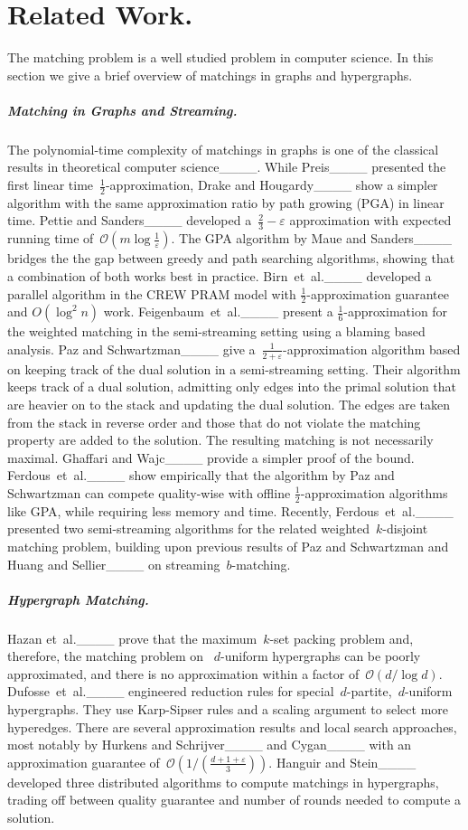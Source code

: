 \section{Related Work.}
The matching problem is a well studied problem in computer science.
 In this section we give a brief overview of matchings in graphs and hypergraphs.
\subparagraph{Matching in Graphs and Streaming.}
The polynomial-time complexity of matchings in graphs is one of the classical results in theoretical computer science____.
While Preis____ presented the first linear time~$\frac{1}{2}$-approximation, Drake and Hougardy____ show a simpler algorithm with the same approximation ratio by path growing (PGA) in linear time. 
 Pettie and Sanders____ developed a~$\frac{2}{3}-\varepsilon$ approximation with expected running time of~$\mathcal{O}(m\log \frac{1}{\varepsilon})$.
 The GPA algorithm by Maue and Sanders____ bridges the the gap between greedy and path searching algorithms, showing that a combination of both works best in practice.
 Birn~et~al.____ developed a parallel algorithm in the CREW PRAM model with $\frac{1}{2}$-approximation guarantee and $O(\log^2n)$ work.
Feigenbaum~et~al.____ present a $\frac{1}{6}$-approximation for the weighted matching in  the semi-streaming setting using a blaming based analysis.
Paz and Schwartzman____ give a~$\frac{1}{2+\varepsilon}$-approximation algorithm based on  keeping track of the dual solution in a semi-streaming setting.
Their algorithm keeps track of a dual solution, admitting only edges into the primal solution that are heavier on to the stack and updating the dual solution.
 The edges are taken from the stack in reverse order and those that do not violate the matching property are added to the solution.
 The resulting matching is not necessarily maximal.
 Ghaffari and Wajc____ provide a simpler proof of the bound.
 Ferdous~et~al.____ show empirically that the algorithm by Paz and Schwartzman can compete quality-wise with offline $\frac{1}{2}$-approximation algorithms like GPA, while requiring less memory and time.
Recently, Ferdous~et~al.____ presented two semi-streaming algorithms for the related weighted~$k$-disjoint matching problem, building upon previous results of  Paz and Schwartzman and Huang and Sellier____ on streaming~$b$-matching.

\subparagraph{Hypergraph Matching.}
Hazan et~al.____ prove that the maximum~$k$-set packing problem and, therefore, the matching problem on ~$d$-uniform hypergraphs can be poorly approximated, and there is no approximation within a factor of~$\mathcal{O}(d/\log d)$.
Dufosse~et~al.____ engineered reduction rules for special~$d$-partite,~$d$-uniform hypergraphs.
 They use Karp-Sipser rules and a scaling argument to select more hyperedges. 
There are several approximation results and local search approaches, most notably by Hurkens and Schrijver____ and Cygan____  with an approximation guarantee of~$\mathcal{O}(1/\left(\frac{d+1+\varepsilon}{3}\right))$.
Hanguir and Stein____ developed three distributed algorithms to compute  matchings in hypergraphs, trading off between quality guarantee and number of rounds needed to compute a solution.


